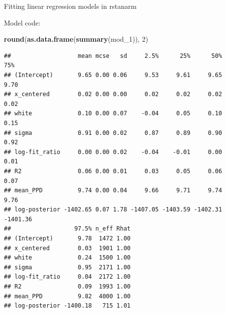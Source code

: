 \documentclass[ignorenonframetext,]{beamer}
\newenvironment{Shaded}{\begin{snugshade}}{\end{snugshade}}
\newcommand{\KeywordTok}[1]{\textcolor[rgb]{0.13,0.29,0.53}{\textbf{#1}}}
\newcommand{\DataTypeTok}[1]{\textcolor[rgb]{0.13,0.29,0.53}{#1}}
\newcommand{\DecValTok}[1]{\textcolor[rgb]{0.00,0.00,0.81}{#1}}
\newcommand{\FloatTok}[1]{\textcolor[rgb]{0.00,0.00,0.81}{#1}}
\newcommand{\StringTok}[1]{\textcolor[rgb]{0.31,0.60,0.02}{#1}}
\newcommand{\OperatorTok}[1]{\textcolor[rgb]{0.81,0.36,0.00}{\textbf{#1}}}
\newcommand{\NormalTok}[1]{#1}
\begin{document}
\begin{frame}[fragile]{Fitting linear regression models in rstanarm}

Model code: \tiny

\begin{Shaded}
\end{Shaded}

\begin{Shaded}
\begin{Highlighting}[]
\KeywordTok{round}\NormalTok{(}\KeywordTok{as.data.frame}\NormalTok{(}\KeywordTok{summary}\NormalTok{(mod_}\DecValTok{1}\NormalTok{)), }\DecValTok{2}\NormalTok{)}
\end{Highlighting}
\end{Shaded}

\begin{verbatim}
##                   mean mcse   sd     2.5%      25%      50%      75%
## (Intercept)       9.65 0.00 0.06     9.53     9.61     9.65     9.70
## x_centered        0.02 0.00 0.00     0.02     0.02     0.02     0.02
## white             0.10 0.00 0.07    -0.04     0.05     0.10     0.15
## sigma             0.91 0.00 0.02     0.87     0.89     0.90     0.92
## log-fit_ratio     0.00 0.00 0.02    -0.04    -0.01     0.00     0.01
## R2                0.06 0.00 0.01     0.03     0.05     0.06     0.07
## mean_PPD          9.74 0.00 0.04     9.66     9.71     9.74     9.76
## log-posterior -1402.65 0.07 1.78 -1407.05 -1403.59 -1402.31 -1401.36
##                  97.5% n_eff Rhat
## (Intercept)       9.78  1472 1.00
## x_centered        0.03  1901 1.00
## white             0.24  1500 1.00
## sigma             0.95  2171 1.00
## log-fit_ratio     0.04  2172 1.00
## R2                0.09  1993 1.00
## mean_PPD          9.82  4000 1.00
## log-posterior -1400.18   715 1.01
\end{verbatim}

\end{frame}
\end{document}
